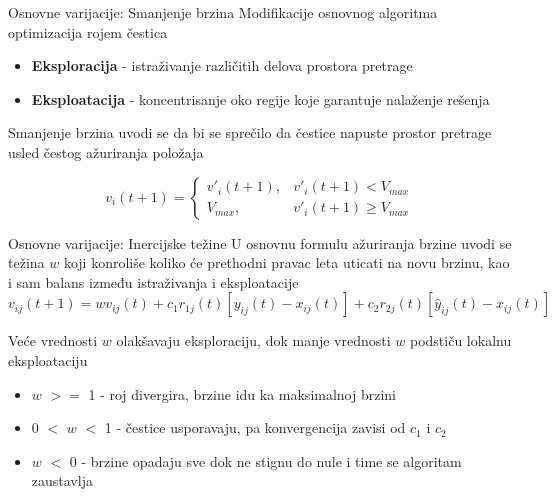 \documentclass{beamer}
\begin{document}
\begin{frame}{Osnovne varijacije: Smanjenje brzina}
Modifikacije osnovnog algoritma optimizacija rojem čestica

\begin{itemize}
    \item \textbf{Eksploracija} - istraživanje različitih delova prostora pretrage
    \item \textbf{Eksploatacija}  -  koncentrisanje oko regije koje garantuje nalaženje rešenja
\end{itemize}
Smanjenje brzina uvodi se da bi se sprečilo da čestice napuste  prostor pretrage usled čestog ažuriranja položaja


\begin{equation}
    v_i(t+1) = \begin{cases}
                
            v'_i(t+1),  &  v'_i(t+1) < V_{max}\\
            V_{max},  &   v'_i(t+1) \geq V_{max}
           
             \end{cases}
\end{equation}

\end{frame}

\begin{frame}{Osnovne varijacije: Inercijske težine}
U osnovnu formulu ažuriranja brzine uvodi se težina $w$ koji konroliše koliko će prethodni pravac leta uticati na novu brzinu, kao i sam balans između istraživanja i eksploatacije
\[v_{ij}(t+1) = wv_{ij}(t) + c_1r_{1j}(t)[y_{ij}(t) - x_{ij}(t)] + c_2r_{2j}(t)[\hat{y}_{ij}(t) - x_{ij}(t)] \]

Veće vrednosti $w$ olakšavaju eksploraciju, dok manje vrednosti $w$ podstiču lokalnu eksploataciju

\begin{itemize}
    \item $w$ $>=$ 1 - roj divergira, brzine idu ka maksimalnoj brzini
    \item 0 $<$ $w$ $<$ 1  -  čestice usporavaju, pa konvergencija zavisi od $c_1$ i $c_2$
    \item $w$ $<$ 0 -  brzine opadaju sve dok ne stignu do nule i time se algoritam zaustavlja
\end{itemize}

\end{frame}
\end{document}
